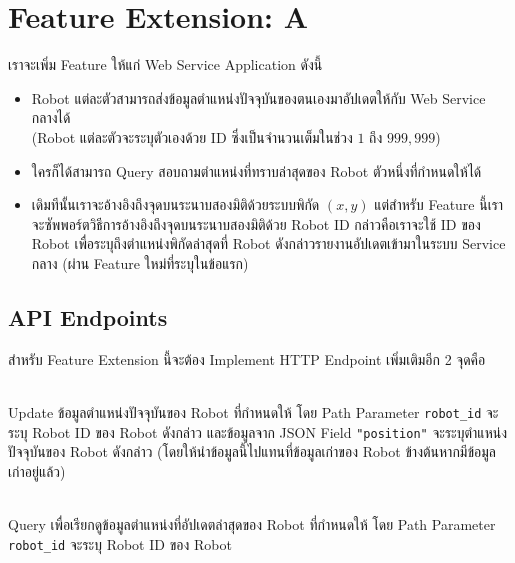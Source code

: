 
%

\section{Feature Extension: A}

\noindent
เราจะเพิ่ม Feature ให้แก่ Web Service Application ดังนี้
\begin{itemize}[topsep=0pc,itemsep=0pc]
\item  
    Robot แต่ละตัวสามารถส่งข้อมูลตำแหน่งปัจจุบันของตนเองมาอัปเดตให้กับ Web Service กลางได้ \\
    (Robot แต่ละตัวจะระบุตัวเองด้วย ID ซึ่งเป็นจำนวนเต็มในช่วง $1$ ถึง $999,\!999$)
\item 
    ใครก็ได้สามารถ Query สอบถามตำแหน่งที่ทราบล่าสุดของ Robot ตัวหนึ่งที่กำหนดให้ได้
\item 
    เดิมทีนั้นเราจะอ้างอิงถึงจุดบนระนาบสองมิติด้วยระบบพิกัด $(x, y)$ แต่สำหรับ Feature นี้เราจะซัพพอร์ตวิธีการอ้างอิงถึงจุดบนระนาบสองมิติด้วย Robot ID \;
    กล่าวคือเราจะใช้ ID ของ Robot เพื่อระบุถึงตำแหน่งพิกัดล่าสุดที่ Robot ดังกล่าวรายงานอัปเดตเข้ามาในระบบ Service กลาง
    (ผ่าน Feature ใหม่ที่ระบุในข้อแรก)
\end{itemize}

\subsection{API Endpoints}

\noindent
สำหรับ Feature Extension นี้จะต้อง Implement HTTP Endpoint เพิ่มเติมอีก 2 จุดคือ

\begin{description}[parsep=0.5pc]
\item[\npt{PUT}{/robot/\{robot\_id\}/position}] ~ \\
    Update ข้อมูลตำแหน่งปัจจุบันของ Robot ที่กำหนดให้ \;
    โดย Path Parameter \lstinline{robot_id} จะระบุ Robot ID ของ Robot ดังกล่าว และข้อมูลจาก JSON Field \lstinline{"position"} จะระบุตำแหน่งปัจจุบันของ Robot ดังกล่าว \;
    (โดยให้นำข้อมูลนี้ไปแทนที่ข้อมูลเก่าของ Robot ข้างต้นหากมีข้อมูลเก่าอยู่แล้ว)
\item[\npt{GET}{/robot/\{robot\_id\}/position}] ~ \\
    Query เพื่อเรียกดูข้อมูลตำแหน่งที่อัปเดตล่าสุดของ Robot ที่กำหนดให้ \;
    โดย Path Parameter \lstinline{robot_id} จะระบุ Robot ID ของ Robot
\end{description}


